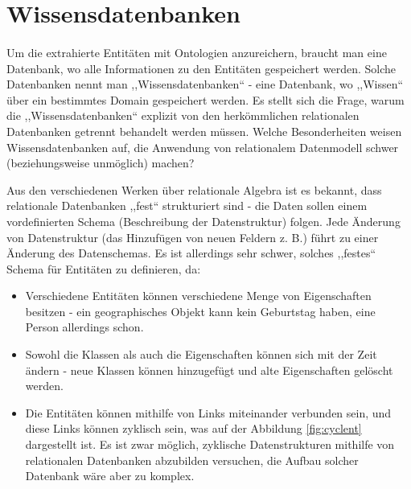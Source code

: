 \section{Wissensdatenbanken} \label{sec:wiss}
\paragraph{}
Um die extrahierte Entitäten mit Ontologien anzureichern, braucht man eine Datenbank, wo alle Informationen zu den Entitäten gespeichert werden. Solche Datenbanken nennt man ,,Wissensdatenbanken`` - eine Datenbank, wo ,,Wissen`` über ein bestimmtes Domain gespeichert werden. Es stellt sich die Frage, warum die ,,Wissensdatenbanken`` explizit von den herkömmlichen relationalen Datenbanken getrennt behandelt werden müssen. Welche Besonderheiten weisen Wissensdatenbanken auf, die Anwendung von relationalem Datenmodell schwer (beziehungsweise unmöglich) machen?

Aus den verschiedenen Werken über relationale Algebra\cite{meier2013relationale} ist es bekannt, dass relationale Datenbanken ,,fest`` strukturiert sind - die Daten sollen einem vordefinierten Schema (Beschreibung der Datenstruktur) folgen. Jede Änderung von Datenstruktur (das Hinzufügen von neuen Feldern z. B.) führt zu einer Änderung des Datenschemas. Es ist allerdings sehr schwer, solches ,,festes`` Schema für Entitäten zu definieren, da:
\begin{itemize}
\item Verschiedene Entitäten können verschiedene Menge von Eigenschaften besitzen - ein geographisches Objekt kann kein Geburtstag haben, eine Person allerdings schon.
\item Sowohl die Klassen als auch die Eigenschaften können sich mit der Zeit ändern - neue Klassen können hinzugefügt und alte Eigenschaften gelöscht werden.
\item Die Entitäten können mithilfe von Links miteinander verbunden sein, und diese Links können zyklisch sein, was auf der Abbildung \ref{fig:cyclent} dargestellt ist. Es ist zwar möglich, zyklische Datenstrukturen mithilfe von relationalen Datenbanken abzubilden versuchen, die Aufbau solcher Datenbank wäre aber zu komplex.
\end{itemize}

